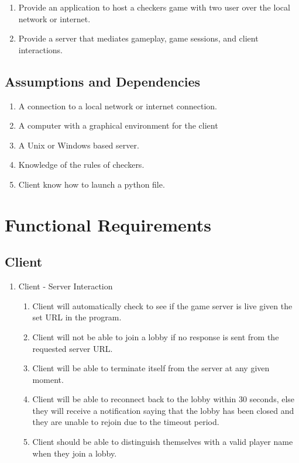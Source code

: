 \documentclass[10pt]{article}
\begin{document}
\begin{enumerate}
    \item Provide an application to host a checkers game with two user over the local network or internet.
    \item Provide a server that mediates gameplay, game sessions, and client interactions.
\end{enumerate}

\subsection{Assumptions and Dependencies}

\begin{enumerate}
    \item A connection to a local network or internet connection.
    \item A computer with a graphical environment for the client
    \item A Unix or Windows based server.
    \item Knowledge of the rules of checkers.
    \item Client know how to launch a python file.
\end{enumerate}

\section{Functional Requirements}

\subsection{Client}

\begin{enumerate}[label*=R\arabic*.]
    \item Client - Server Interaction
    \begin{enumerate}[label*=\arabic*.]
        \item Client will automatically check to see if the game server is live given the set URL in the program.
        \item Client will not be able to join a lobby if no response is sent from the requested server URL.
        \item Client will be able to terminate itself from the server at any given moment.
        \item Client will be able to reconnect back to the lobby within 30 seconds, else they will receive a notification saying that the lobby has been closed and they are unable to rejoin due to the timeout period.
        \item Client should be able to distinguish themselves with a valid player name when they join a lobby.
    \end{enumerate}
\end{enumerate}
\end{document}
